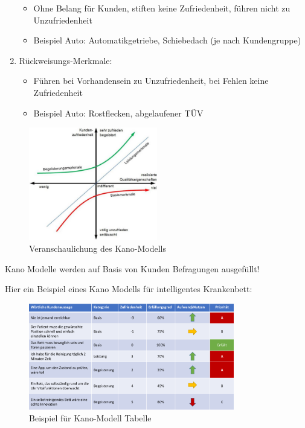 \documentclass[11pt, a4paper]{article}
\begin{document}
\begin{enumerate}
\begin{itemize}
        \item Ohne Belang für Kunden, stiften keine Zufriedenheit, führen nicht zu Unzufriedenheit
        \item Beispiel Auto: Automatikgetriebe, Schiebedach (je nach Kundengruppe)
    \end{itemize}
    \item Rückweisungs-Merkmale:
    \begin{itemize}
        \item Führen bei Vorhandensein zu Unzufriedenheit, bei Fehlen keine Zufriedenheit
        \item Beispiel Auto: Rostflecken, abgelaufener TÜV
    \end{itemize}
\end{enumerate}

\vspace{2em}

\begin{figure}[h]
    \centering
    \includegraphics[width=0.5\textwidth]{Kano-00.png}
    \caption{Veranschaulichung des Kano-Modells}
    \label{fig:Kano-00}
\end{figure}

\newpage


Kano Modelle werden auf Basis von Kunden Befragungen ausgefüllt!

Hier ein Beispiel eines Kano Modells für intelligentes Krankenbett:

\vspace{1em}

\begin{figure}[h]
    \centering
    \includegraphics[width=0.8\textwidth]{Kano-01.png}
    \caption{Beispiel für Kano-Modell Tabelle}
    \label{fig:Kano-01}
\end{figure}
\end{document}
